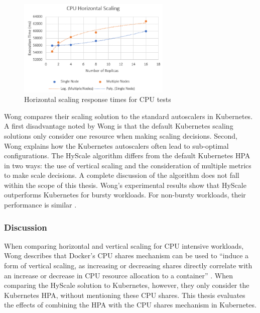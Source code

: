 \begin{figure}[h]
\begin{center}
\includegraphics[width=0.65\textwidth]{Images/Related_work/Hyscale_1.PNG}
\end{center}
\caption{Horizontal scaling response times for CPU tests\citep{hyscale}}
\label{fig:hyscale1}
\end{figure}

Wong compares their scaling solution to the standard autoscalers in Kubernetes. A first disadvantage noted by Wong is that the default Kubernetes scaling solutions only consider one resource when making scaling decisions. Second, Wong explains how the Kubernetes autoscalers often lead to sub-optimal configurations. The HyScale algorithm differs from the default Kubernetes HPA in two ways: the use of vertical scaling and the consideration of multiple metrics to make scale decisions. A complete discussion of the algorithm does not fall within the scope of this thesis. Wong's experimental results show that HyScale outperforms Kubernetes for bursty workloads. For non-bursty workloads, their performance is similar \citep{hyscale}.

\subsubsection{Discussion}
When comparing horizontal and vertical scaling for CPU intensive workloads, Wong describes that Docker's CPU shares mechanism can be used to ``induce a form of vertical scaling, as increasing or decreasing shares directly correlate with an increase or decrease in CPU resource allocation to a container'' \citep{hyscale}. When comparing the HyScale solution to Kubernetes, however, they only consider the Kubernetes HPA, without mentioning these CPU shares. This thesis evaluates the effects of combining the HPA with the CPU shares mechanism in Kubernetes. 
